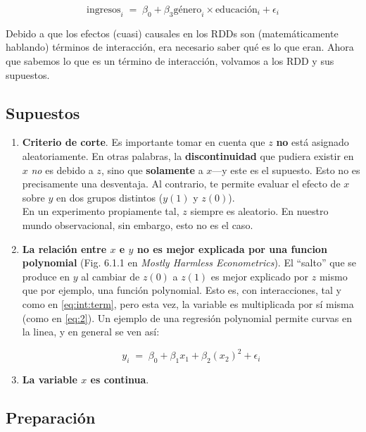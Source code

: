 \documentclass[10pt]{article}
\begin{document}
		\begin{equation}\label{eq:int:term:mala}
			\text{ingresos}_{i} \;=\; \beta_{0} + \beta_{3}{\text{g\'enero}}_{i}\times \text{educaci\'on}_{i} + \epsilon_{i}
		\end{equation}

Debido a que los efectos (cuasi) causales en los RDDs son (matem\'aticamente hablando) t\'erminos de interacci\'on, era necesario saber qu\'e es lo que eran. Ahora que sabemos lo que es un t\'ermino de interacci\'on, volvamos a los RDD y sus supuestos.

\subsection*{Supuestos}

\begin{enumerate}
	\item {\bf Criterio de corte}. Es importante tomar en cuenta que $z$ {\bf no} est\'a asignado aleatoriamente. En otras palabras, la {\bf discontinuidad} que pudiera existir en $x$ \emph{no} es debido a $z$, sino que {\bf solamente} a $x$---y este es el supuesto. Esto no es precisamente una desventaja. Al contrario, te permite evaluar el efecto de $x$ sobre $y$ en dos grupos distintos ($y(1)$ y $z(0)$). 
	\\
	En un experimento propiamente tal, $z$ siempre es aleatorio. En nuestro mundo observacional, sin embargo, esto no es el caso.

	\item {\bf La relaci\'on entre $x$ e $y$ no es mejor explicada por una funcion polynomial} (Fig. 6.1.1 en \emph{Mostly Harmless Econometrics}). El ``salto'' que se produce en $y$ al cambiar de $z(0)$ a $z(1)$ es mejor explicado por $z$ mismo que por ejemplo, una funci\'on polynomial. Esto es, con interacciones, tal y como en \autoref{eq:int:term}, pero esta vez, la variable es multiplicada por s\'i misma (como en \autoref{eq:2}). Un ejemplo de una regresi\'on polynomial permite curvas en la linea, y en general se ven as\'i:

		\begin{equation}\label{eq:2}
			y_{i} \;=\; \beta_{0} + \beta_{1}x_{1} + \beta_{2}(x_{2})^2 + \epsilon_{i}
		\end{equation}

	\item {\bf La variable $x$ es continua}. 
\end{enumerate}

\subsection*{Preparaci\'on}
\end{document}
